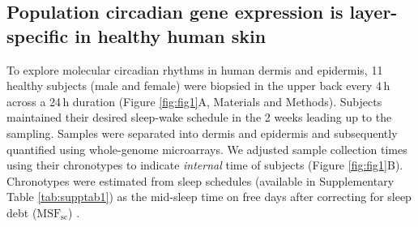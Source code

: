 \subsection*{Population circadian gene expression is layer-specific in healthy human skin} 
To explore molecular circadian rhythms in human dermis and epidermis, 11 healthy subjects (male and female) were biopsied in the upper back every 4\,h across a 24\,h duration (Figure \ref{fig:fig1}A, Materials and Methods). Subjects maintained their desired sleep-wake schedule in the 2 weeks leading up to the sampling. Samples were separated into dermis and epidermis and subsequently quantified using whole-genome microarrays. We adjusted sample collection times using their chronotypes to indicate \emph{internal} time of subjects (Figure \ref{fig:fig1}B). Chronotypes were estimated from sleep schedules (available in Supplementary Table \ref{tab:supptab1}) as the mid-sleep time on free days after correcting for sleep debt ($\textrm{MSF}_\textrm{sc}$) \cite{Vetter2021}. 

